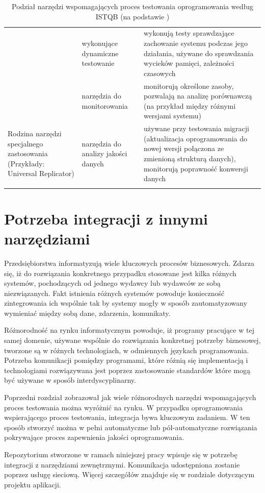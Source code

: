\begin{longtable}{| p{4cm} | p{4cm} | p{8cm} |}
& wykonujące dynamiczne testowanie & wykonują testy sprawdzające zachowanie systemu podczas jego działania, używane do sprawdzania wycieków pamięci, zależności czasowych \\ \cline{2-3}
& narzędzia do monitorowania & monitorują określone zasoby, pozwalają na analizę porównawczą (na przykład między różnymi wersjami systemu) \\ \hline
\hline
\multirow{1}{4cm}{Rodzina narzędzi specjalnego zastosowania (Przykłady: Universal Replicator\cite{replicator})} &
narzędzia do analizy jakości danych & używane przy testowania migracji (aktualizacja oprogramowania do nowej wersji połączona ze zmienioną strukturą danych), monitorują poprawność konwersji danych \\
\hline
\caption{Podział narzędzi wspomagających proces testowania oprogramowania według ISTQB (na podstawie  \cite{istqb})}\\
\end{longtable}

\section{Potrzeba integracji z innymi narzędziami}

Przedsiębiorstwa informatyzują wiele kluczowych procesów biznesowych. Zdarza się, iż do rozwiązania konkretnego przypadku stosowane jest kilka różnych systemów, pochodzących od jednego wydawcy lub wydawców ze sobą niezwiązanych. Fakt istnienia różnych systemów powoduje konieczność zintegrowania ich wspólnie tak by systemy mogły w sposób zautomatyzowany wymieniać między sobą dane, zdarzenia, komunikaty.

Różnorodność na rynku informatycznym powoduje, iż programy pracujące w tej samej domenie, używane wspólnie do rozwiązania konkretnej potrzeby biznesowej, tworzone są w różnych technologiach, w odmiennych językach programowania. Potrzeba komunikacji pomiędzy programami, które różnią się implementacją i technologiami rozwiązywana jest poprzez zastosowanie standardów które mogą być używane w sposób interdyscyplinarny.

Poprzedni rozdział zobrazował jak wiele różnorodnych narzędzi wspomagających proces testowania można wyróżnić na rynku. W przypadku oprogramowania wspierającego proces testowania, integracja bywa kluczowym zadaniem. W ten sposób stworzyć można w pełni automatyczne lub pół-automatyczne rozwiązania pokrywające proces zapewnienia jakości oprogramowania. 

Repozytorium stworzone w ramach niniejszej pracy wpisuje się w potrzebę integracji z narzędziami zewnętrznymi. Komunikacja udostępniona zostanie poprzez usługę sieciową. Więcej szczegółów znajduje się w rozdziale dotyczącym projektu aplikacji.

